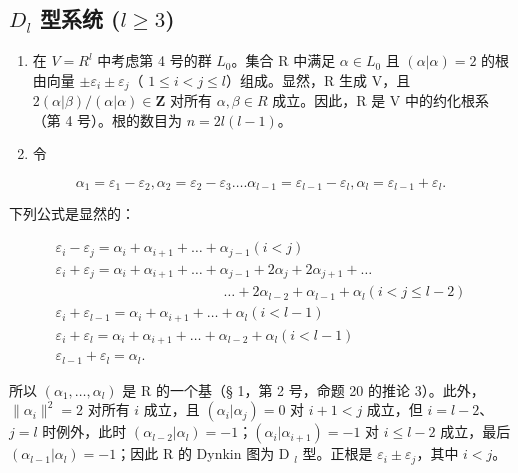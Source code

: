 \subsection{\texorpdfstring{\(D_{l}\) 型系统 (\(l \geqslant 3\))}{D\_l 型系统 (l >= 3)}}

\begin{enumerate}
\def\labelenumi{(\Roman{enumi})}
\item
  在 \(V = R^{l}\) 中考虑第 4 号的群 \(L_{0}\)。集合 R 中满足 \(\alpha \in L_{0}\) 且 \((\alpha|\alpha) = 2\) 的根由向量 \(\pm\varepsilon_{i} \pm \varepsilon_{j}\)（ \(1 \leqslant i < j \leqslant l\)）组成。显然，R 生成 V，且 \(2(\alpha|\beta)/(\alpha|\alpha) \in \mathbf{Z}\) 对所有 \(\alpha, \beta \in R\) 成立。因此，R 是 V 中的约化根系（第 4 号）。根的数目为 \(n = 2l(l - 1)\)。
\item
  令
\end{enumerate}

\[
\alpha_ {1} = \varepsilon_ {1} - \varepsilon_ {2}, \alpha_ {2} = \varepsilon_ {2} - \varepsilon_ {3} \dots . \alpha_ {l - 1} = \varepsilon_ {l - 1} - \varepsilon_ {l}, \alpha_ {l} = \varepsilon_ {l - 1} + \varepsilon_ {l}.
\]

下列公式是显然的：

\[
\begin{array}{c} \varepsilon_ {i} - \varepsilon_ {j} = \alpha_ {i} + \alpha_ {i + 1} + \dots + \alpha_ {j - 1} (i <   j) \\ \varepsilon_ {i} + \varepsilon_ {j} = \alpha_ {i} + \alpha_ {i + 1} + \dots + \alpha_ {j - 1} + 2 \alpha_ {j} + 2 \alpha_ {j + 1} + \dots \\ \qquad \qquad \qquad \qquad \qquad \qquad \dots + 2 \alpha_ {l - 2} + \alpha_ {l - 1} + \alpha_ {l} (i <   j \leqslant l - 2) \\ \varepsilon_ {i} + \varepsilon_ {l - 1} = \alpha_ {i} + \alpha_ {i + 1} + \dots + \alpha_ {l} (i <   l - 1) \\ \varepsilon_ {i} + \varepsilon_ {l} = \alpha_ {i} + \alpha_ {i + 1} + \dots + \alpha_ {l - 2} + \alpha_ {l} (i <   l - 1) \\ \varepsilon_ {l - 1} + \varepsilon_ {l} = \alpha_ {l}. \end{array}
\]

所以 \((\alpha_{1},\ldots,\alpha_{l})\) 是 R 的一个基（§ 1，第 2 号，命题 20 的推论 3）。此外，\(\| \alpha_{i}\|^{2}=2\) 对所有 \(i\) 成立，且 \((\alpha_{i}|\alpha_{j})=0\) 对 \(i+1<j\) 成立，但 \(i=l-2\)、\(j=l\) 时例外，此时 \((\alpha_{l-2}|\alpha_{l})=-1\)；\((\alpha_{i}|\alpha_{i+1})=-1\) 对 \(i\leqslant l-2\) 成立，最后 \((\alpha_{l-1}|\alpha_{l})=-1\)；因此 R 的 Dynkin 图为 D \(_{l}\) 型。正根是 \(\varepsilon_{i}\pm\varepsilon_{j}\)，其中 \(i<j\)。

